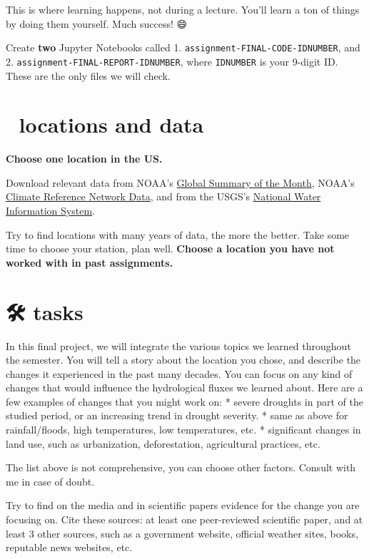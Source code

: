 \documentclass[
  letterpaper,
  DIV=11,
  numbers=noendperiod]{scrreprt}
\begin{document}
This is where learning happens, not during a lecture. You'll learn a ton
of things by doing them yourself. Much success! 😄

Create \textbf{two} Jupyter Notebooks called 1.
\texttt{assignment-FINAL-CODE-IDNUMBER}, and 2.
\texttt{assignment-FINAL-REPORT-IDNUMBER}, where \texttt{IDNUMBER} is
your 9-digit ID. These are the only files we will check.

\hypertarget{locations-and-data-2}{%
\section{📌 locations and data}\label{locations-and-data-2}}

\textbf{Choose one location in the US.}

Download relevant data from NOAA's
\href{https://gis.ncdc.noaa.gov/maps/ncei/cdo/monthly}{Global Summary of
the Month}, NOAA's
\href{https://www.ncdc.noaa.gov/crn/qcdatasets.html}{Climate Reference
Network Data}, and from the USGS's
\href{https://maps.waterdata.usgs.gov/mapper/index.html}{National Water
Information System}.

Try to find locations with many years of data, the more the better. Take
some time to choose your station, plan well. \textbf{Choose a location
you have not worked with in past assignments.}

\hypertarget{tasks-4}{%
\section{🛠 tasks}\label{tasks-4}}

In this final project, we will integrate the various topics we learned
throughout the semester. You will tell a story about the location you
chose, and describe the changes it experienced in the past many decades.
You can focus on any kind of changes that would influence the
hydrological fluxes we learned about. Here are a few examples of changes
that you might work on: * severe droughts in part of the studied period,
or an increasing trend in drought severity. * same as above for
rainfall/floods, high temperatures, low temperatures, etc. * significant
changes in land use, such as urbanization, deforestation, agricultural
practices, etc.

The list above is not comprehensive, you can choose other factors.
Consult with me in case of doubt.

Try to find on the media and in scientific papers evidence for the
change you are focusing on. Cite these sources: at least one
peer-reviewed scientific paper, and at least 3 other sources, such as a
government website, official weather sites, books, reputable news
websites, etc.
\end{document}
